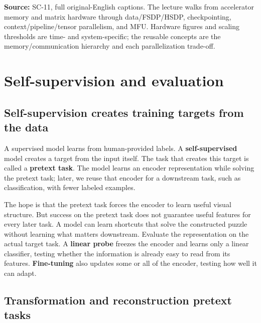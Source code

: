 \textbf{Source:} SC-11, full original-English captions. The lecture walks from accelerator memory and matrix hardware through data/FSDP/HSDP, checkpointing, context/pipeline/tensor parallelism, and MFU. Hardware figures and scaling thresholds are time- and system-specific; the reusable concepts are the memory/communication hierarchy and each parallelization trade-off.

\section{Self-supervision and evaluation}\label{04-visual-computing-ii-ch031-self-supervision-and-evaluation}

\hypertarget{04-visual-computing-ii-ch031-self-supervision-and-evaluation}{}

\subsection{Self-supervision creates training targets from the data}\label{04-visual-computing-ii-ch031-self-supervision-creates-training-targets-from-the-data}

\hypertarget{04-visual-computing-ii-ch031-self-supervision-creates-training-targets-from-the-data}{}

A supervised model learns from human-provided labels. A \textbf{self-supervised} model creates a target from the input itself. The task that creates this target is called a \textbf{pretext task}. The model learns an encoder representation while solving the pretext task; later, we reuse that encoder for a downstream task, such as classification, with fewer labeled examples.

The hope is that the pretext task forces the encoder to learn useful visual structure. But success on the pretext task does not guarantee useful features for every later task. A model can learn shortcuts that solve the constructed puzzle without learning what matters downstream. Evaluate the representation on the actual target task. A \textbf{linear probe} freezes the encoder and learns only a linear classifier, testing whether the information is already easy to read from its features. \textbf{Fine-tuning} also updates some or all of the encoder, testing how well it can adapt.

\subsection{Transformation and reconstruction pretext tasks}\label{04-visual-computing-ii-ch031-transformation-and-reconstruction-pretext-tasks}

